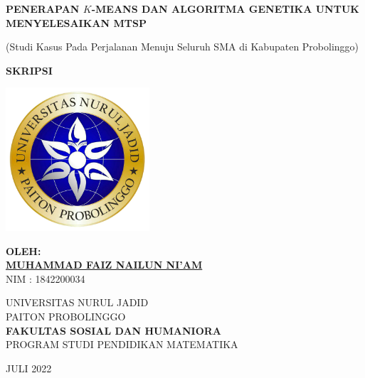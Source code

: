 \begin{titlepage}
   \begin{center}

       \textbf{PENERAPAN $K$-MEANS DAN ALGORITMA GENETIKA UNTUK MENYELESAIKAN MTSP}
       
       (Studi Kasus Pada Perjalanan Menuju Seluruh SMA di Kabupaten Probolinggo)

       \vfill
       \textbf{SKRIPSI}
       \vfill
       
       \includegraphics[width=0.4\textwidth]{Gambar/logo.png}
       
       \vfill
       
       \textbf{OLEH:}\\
       \textbf{\underline{MUHAMMAD FAIZ NAILUN NI'AM}}\\
       NIM : 1842200034

       \vfill
       
       UNIVERSITAS NURUL JADID\\
       PAITON PROBOLINGGO\\
       \textbf{FAKULTAS SOSIAL DAN HUMANIORA}\\       
       PROGRAM STUDI PENDIDIKAN MATEMATIKA\\
       
       \vfill       
       
       JULI 2022
       
   \end{center}
\end{titlepage}